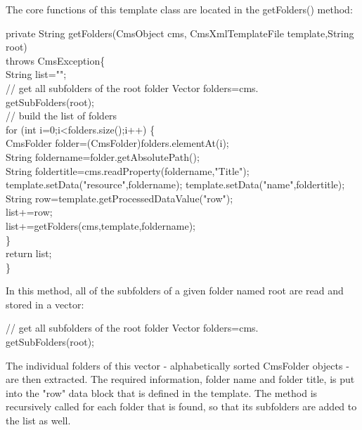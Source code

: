 The core functions of this template class are located in the {\meth getFolders()}
method:

\begin{java}
private String getFolders(CmsObject cms, CmsXmlTemplateFile template,String root)\\
\jtabc        throws CmsException\{\\
\jtabd           String list="";\\
// get all subfolders of the root folder Vector folders=cms.\\
getSubFolders(root);\\
\jtabd           // build the list of folders\\
\jtabd           for (int i=0;i<folders.size();i++) \{\\
\jtabd           CmsFolder folder=(CmsFolder)folders.elementAt(i);\\
\jtabd           String foldername=folder.getAbsolutePath();\\
String      foldertitle=cms.readProperty(foldername,"Title");\\
template.setData("resource",foldername); template.setData("name",foldertitle);\\
\jtabd           String row=template.getProcessedDataValue("row");\\
\jtabd           list+=row;\\
\jtabd           list+=getFolders(cms,template,foldername);\\
\jtabc        \}\\
\jtabc        return list;\\
\}\\
\end{java}

In this method, all of the subfolders of a given folder named {\name root}
are read and stored in a vector:

\begin{java}
// get all subfolders of the root folder Vector folders=cms.\\
getSubFolders(root);\\
\end{java}

The individual folders of this vector - alphabetically sorted CmsFolder
objects - are then extracted. The required information, folder name and
folder title, is put into the "row" data block that is defined in the
template. The method is recursively called for each folder that is
found, so that its subfolders are added to the list as well.\\

